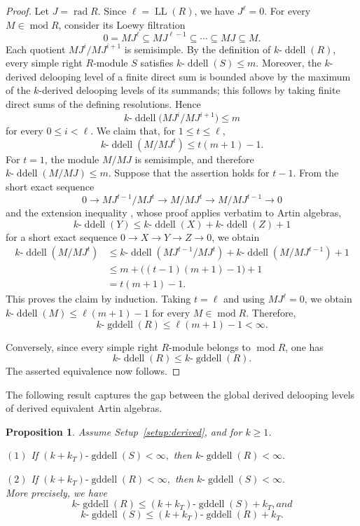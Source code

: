 \documentclass[12pt,a4paper,reqno]{amsart}
\theoremstyle{plain}
\newtheorem{proposition}[theorem]{Proposition}
\theoremstyle{definition}
\theoremstyle{remark}
\DeclareMathOperator{\modd}{mod}
\DeclareMathOperator{\ddell}{ddell}
\DeclareMathOperator{\gddell}{gddell}
\begin{document}
\begin{proof}
Let \(J=\operatorname{rad}R\). Since
\(\ell=\operatorname{LL}(R)\), we have \(J^\ell=0\).
For every \(M\in\modd R\), consider its Loewy
filtration
\[
0=MJ^\ell\subseteq MJ^{\ell-1}\subseteq\cdots
\subseteq MJ\subseteq M.
\]
Each quotient $
MJ^i/MJ^{i+1}$ 
is semisimple. By the definition of
\(k\text{-}\ddell(R)\), every simple right
\(R\)-module \(S\) satisfies $k\text{-}\ddell(S)\leq m.$ 
Moreover, the \(k\)-derived delooping level of a finite direct
sum is bounded above by the maximum of the \(k\)-derived
delooping levels of its summands; this follows by taking finite
direct sums of the defining resolutions. Hence
\[
k\text{-}\ddell
   \bigl(MJ^i/MJ^{i+1}\bigr)\leq m
\]
for every \(0\leq i<\ell\). We claim that, for \(1\leq t\leq\ell\),
\[
k\text{-}\ddell(M/MJ^t)
\leq t(m+1)-1.
\]
For \(t=1\), the module \(M/MJ\) is semisimple, and therefore
$k\text{-}\ddell(M/MJ)\leq m.$ 
Suppose that the assertion holds for \(t-1\). From the short
exact sequence
\[
0\longrightarrow MJ^{t-1}/MJ^t
\longrightarrow M/MJ^t
\longrightarrow M/MJ^{t-1}
\longrightarrow0
\]
and the extension inequality \cite[Lemma~3.1]{GuoIgusa}, whose
proof applies verbatim to Artin algebras,
\[
k\text{-}\ddell(Y)
\leq
k\text{-}\ddell(X)
+
k\text{-}\ddell(Z)+1
\]
for a short exact sequence
\(0\to X\to Y\to Z\to0\), we obtain
\begin{align*}
k\text{-}\ddell(M/MJ^t)
&\leq
k\text{-}\ddell(MJ^{t-1}/MJ^t)
+
k\text{-}\ddell(M/MJ^{t-1})+1\\
&\leq
m+\bigl((t-1)(m+1)-1\bigr)+1\\
&=t(m+1)-1.
\end{align*}
This proves the claim by induction. Taking \(t=\ell\) and using \(MJ^\ell=0\), we obtain $k\text{-}\ddell(M)
\leq\ell(m+1)-1$ 
for every \(M\in\modd R\). Therefore,
\[
k\text{-}\gddell(R)
\leq\ell(m+1)-1<\infty.
\]

Conversely, since every simple right \(R\)-module belongs to
\(\modd R\), one has
\[
k\text{-}\ddell(R)
\leq k\text{-}\gddell(R).
\]
The asserted equivalence now follows.
\end{proof}

The following result captures the gap between the global derived delooping levels of derived equivalent Artin algebras. 
\begin{proposition}\label{pro:gddell-finiteness}
Assume Setup~\ref{setup:derived}, and for  $k\geq 1$.

$(1)$ If $(k+k_T)\text{-}\gddell(S)<\infty,$  then $k\text{-}\gddell(R)<\infty.$

$(2)$ If $(k+k_T)\text{-}\gddell(R)<\infty,$ then $k\text{-}\gddell(S)<\infty.$\\
More precisely, we have  
\[ k\text{-}\gddell(R) \le (k+k_T)\text{-}\gddell(S) +k_T, and \]
\[k\text{-}\gddell(S) \le (k+k_T)\text{-}\gddell(R) +k_T. \]
\end{proposition}
\end{document}
